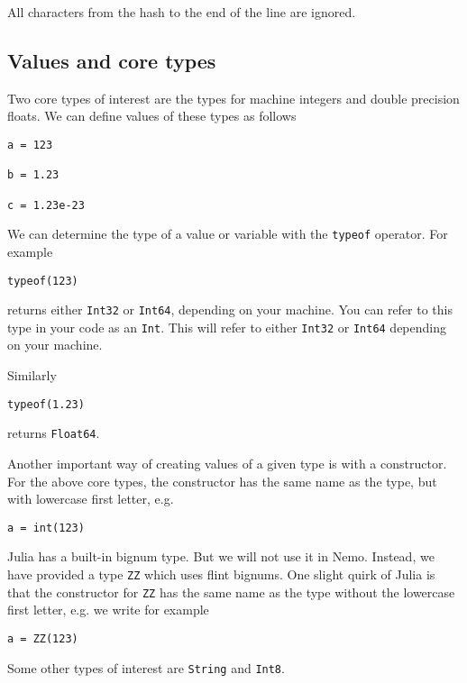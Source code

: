 \documentclass[a4paper,10pt]{article}
\newcommand{\code}{\lstinline}
\begin{document}
All characters from the hash to the end of the line are ignored.

\subsection{Values and core types}

Two core types of interest are the types for machine integers and double precision floats. We can
define values of these types as follows

\begin{lstlisting}
a = 123

b = 1.23

c = 1.23e-23
\end{lstlisting}

We can determine the type of a value or variable with the \code{typeof} operator. For example

\begin{lstlisting}
typeof(123)
\end{lstlisting}

returns either \code{Int32} or \code{Int64}, depending on your machine. You can refer to this type in
your code as an \code{Int}. This will refer to either \code{Int32} or \code{Int64} depending on your
machine.

Similarly

\begin{lstlisting}
typeof(1.23)
\end{lstlisting}

returns \code{Float64}.

Another important way of creating values of a given type is with a constructor. For the above core
types, the constructor has the same name as the type, but with lowercase first letter, e.g.

\begin{lstlisting}
a = int(123)
\end{lstlisting}

Julia has a built-in bignum type. But we will not use it in Nemo. Instead, we have provided a type
\code{ZZ} which uses flint bignums. One slight quirk of Julia is that the constructor for \code{ZZ}
has the same name as the type without the lowercase first letter, e.g. we write for example

\begin{lstlisting}
a = ZZ(123)
\end{lstlisting}

Some other types of interest are \code{String} and \code{Int8}.
\end{document}

